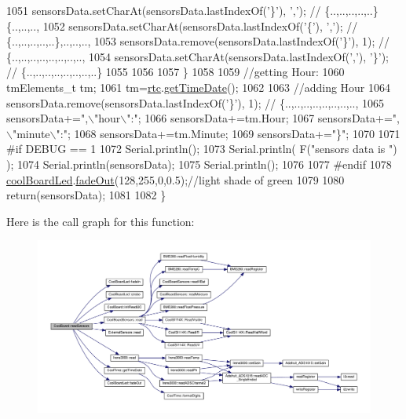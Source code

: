 \begin{DoxyCode}
1051         sensorsData.setCharAt(sensorsData.lastIndexOf(\textcolor{charliteral}{'\}'}), \textcolor{charliteral}{','}); \textcolor{comment}{// \{..,..,..,..,..\}\{..,..,..,}
1052         sensorsData.setCharAt(sensorsData.lastIndexOf(\textcolor{charliteral}{'\{'}), \textcolor{charliteral}{','}); \textcolor{comment}{// \{..,..,..,..,..\},..,..,..,}
1053         sensorsData.remove(sensorsData.lastIndexOf(\textcolor{charliteral}{'\}'}), 1); \textcolor{comment}{// \{..,..,..,..,..,..,..,..,}
1054         sensorsData.setCharAt(sensorsData.lastIndexOf(\textcolor{charliteral}{','}), \textcolor{charliteral}{'\}'}); \textcolor{comment}{// \{..,..,..,..,..,..,..,..\}      }
1055         
1056         
1057     \}
1058 
1059     \textcolor{comment}{//getting Hour:}
1060     tmElements\_t tm;
1061     tm=\hyperlink{class_cool_board_a50d2a6716879d64a85f3c6b44ad63275}{rtc}.\hyperlink{class_cool_time_a7a7501c5ca77dd1248bea704c44f986c}{getTimeDate}();
1062     
1063     \textcolor{comment}{//adding Hour}
1064     sensorsData.remove(sensorsData.lastIndexOf(\textcolor{charliteral}{'\}'}), 1); \textcolor{comment}{// \{..,..,..,..,..,..,..,..,   }
1065     sensorsData+=\textcolor{stringliteral}{",\(\backslash\)"hour\(\backslash\)":"};  
1066     sensorsData+=tm.Hour;
1067     sensorsData+=\textcolor{stringliteral}{",\(\backslash\)"minute\(\backslash\)":"};
1068     sensorsData+=tm.Minute;
1069     sensorsData+=\textcolor{stringliteral}{"\}"};
1070     
1071 \textcolor{preprocessor}{#if DEBUG == 1}
1072     Serial.println();
1073     Serial.println( F(\textcolor{stringliteral}{"sensors data is "}) );
1074     Serial.println(sensorsData);
1075     Serial.println();
1076 
1077 \textcolor{preprocessor}{#endif}
1078     \hyperlink{class_cool_board_a1b1d3c684a5baa56b08486e192fd8e97}{coolBoardLed}.\hyperlink{class_cool_board_led_a93d545679237e8cc858324367149775c}{fadeOut}(128,255,0,0.5);\textcolor{comment}{//light shade of green}
1079 
1080     \textcolor{keywordflow}{return}(sensorsData);
1081 
1082 \}
\end{DoxyCode}
Here is the call graph for this function\+:\nopagebreak
\begin{figure}[H]
\begin{center}
\leavevmode
\includegraphics[width=350pt]{d7/df9/class_cool_board_ad03abdce2e65f520bbf2cff0f2d083cf_cgraph}
\end{center}
\end{figure}

